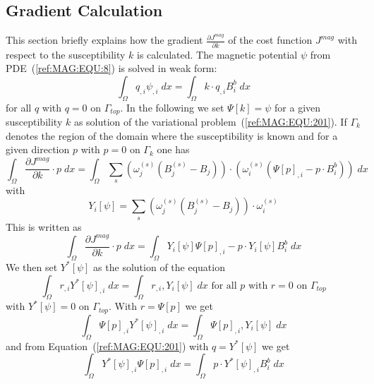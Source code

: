 \subsection{Gradient Calculation}
This section briefly explains how the gradient
$\frac{\partial J^{mag}}{\partial k}$ of the cost function $J^{mag}$ with
respect to the susceptibility $k$ is calculated. 
The magnetic potential $\psi$ from PDE~(\ref{ref:MAG:EQU:8}) is solved in weak form:
\begin{equation}\label{ref:MAG:EQU:201}
\int_{\Omega} q_{,i} \psi_{,i} \; dx  = \int_{\Omega}  k \cdot q_{,i}  B^b_i \; dx 
\end{equation} 
for all $q$ with $q=0$ on $\Gamma_{top}$.
In the following we set $\Psi[k]=\psi$ for a given susceptibility $k$ as
solution of the variational problem~(\ref{ref:MAG:EQU:201}).
If $\Gamma_{k}$ denotes the region of the domain where the susceptibility is
known and for a given direction $p$ with $p=0$ on $\Gamma_{k}$ one has
\begin{equation}\label{ref:MAG:EQU:201}
\int_{\Omega}   \frac{\partial J^{mag}}{\partial k} \cdot p \; dx  = \int_{\Omega}  
\sum_{s} (\omega^{(s)}_j 
( B^{(s)}_j-B_{j}))  \cdot ( \omega^{(s)}_i ( \Psi[p]_{,i} - p  \cdot B^b_i  ) ) \; dx  
\end{equation} 
with
\begin{equation}\label{ref:MAG:EQU:202c}
Y_i[\psi]=   \sum_{s} (\omega^{(s)}_j 
(B^{(s)}_j - B_{j}) )  \cdot \omega^{(s)}_i  
\end{equation} 
This is written as 
\begin{equation}\label{ref:MAG:EQU:201}
\int_{\Omega}   \frac{\partial J^{mag}}{\partial k} \cdot p \;  dx  = \int_{\Omega}  
Y_i[\psi] \Psi[p]_{,i} - p \cdot Y_i[\psi]B^b_i   \; dx  
\end{equation} 
We then set $Y^*[\psi]$ as the solution of the equation 
\begin{equation}\label{ref:MAG:EQU:202d}
\int_{\Omega} r_{,i} Y^*[\psi]_{,i} \; dx  =  \int_{\Omega} r_{,i} ,Y_i[\psi]  \; dx  \mbox{ for all } p \mbox{ with } r=0 \mbox{ on } \Gamma_{top}
\end{equation} 
with $Y^*[\psi]=0$ on $\Gamma_{top}$. With $r=\Psi[p]$ we get
\begin{equation}\label{ref:MAG:EQU:202d}
\int_{\Omega} \Psi[p]_{,i} Y^*[\psi]_{,i} \; dx  =  \int_{\Omega} \Psi[p]_{,i} ,Y_i[\psi]  \; dx
\end{equation} 
and from Equation~(\ref{ref:MAG:EQU:201}) with $q=Y^*[\psi]$ we get
\begin{equation}\label{ref:MAG:EQU:20e}
\int_{\Omega} Y^*[\psi]_{,i}  \Psi[p]_{,i} \; dx  = \int_{\Omega}  p \cdot Y^*[\psi]_{,i}  B^b_i \; dx  
\end{equation}
